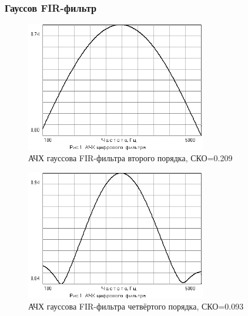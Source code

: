 \subsubsection{Гауссов FIR-фильтр}
\begin{figure}[H]
  \centering
  \includegraphics[width=0.7\textwidth]{data/Z1_GAUSS/gain_FIR_2p.png}
  \caption{АЧХ гауссова FIR-фильтра второго порядка, СКО=0.209}
  \label{fig:}
\end{figure}
\begin{figure}[H]
  \centering
  \includegraphics[width=0.7\textwidth]{data/Z1_GAUSS/gain_FIR_4p.png}
  \caption{АЧХ гауссова FIR-фильтра четвёртого порядка, СКО=0.093}
  \label{fig:}
\end{figure}
